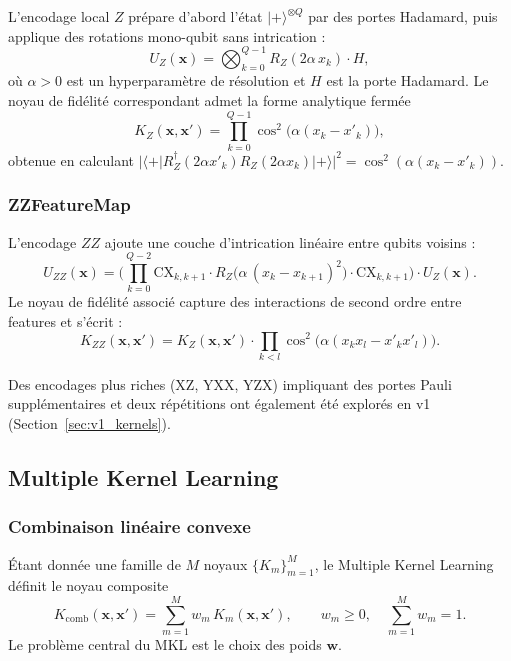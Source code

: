 \documentclass[12pt,a4paper]{article}
\begin{document}
L'encodage local $Z$ prépare d'abord l'état $|+\rangle^{\otimes Q}$ par
des portes Hadamard, puis applique des rotations mono-qubit sans intrication :
\begin{equation}
  U_Z(\bm{x}) = \bigotimes_{k=0}^{Q-1} R_Z(2\alpha\, x_k)\cdot H,
  \label{eq:zmap}
\end{equation}
où $\alpha > 0$ est un hyperparamètre de résolution et $H$ est la porte Hadamard.
Le noyau de fidélité correspondant admet la forme analytique fermée
\begin{equation}
  K_Z(\bm{x}, \bm{x}') = \prod_{k=0}^{Q-1} \cos^2\!\bigl(\alpha(x_k - x'_k)\bigr),
  \label{eq:kz}
\end{equation}
obtenue en calculant $|\langle+|R_Z^\dagger(2\alpha x'_k)R_Z(2\alpha x_k)|+\rangle|^2
= \cos^2(\alpha(x_k - x'_k))$.

\subsubsection{ZZFeatureMap}

L'encodage $ZZ$ ajoute une couche d'intrication linéaire entre qubits voisins :
\begin{equation}
  U_{ZZ}(\bm{x}) =
  \biggl(\prod_{k=0}^{Q-2}
  \mathrm{CX}_{k,k+1}\cdot
  R_Z\!\bigl(\alpha\,(x_k - x_{k+1})^2\bigr)\cdot
  \mathrm{CX}_{k,k+1}\biggr)\cdot U_Z(\bm{x}).
  \label{eq:zzmap}
\end{equation}
Le noyau de fidélité associé capture des interactions de second ordre entre
features et s'écrit :
\begin{equation}
  K_{ZZ}(\bm{x}, \bm{x}') = K_Z(\bm{x}, \bm{x}') \cdot
  \prod_{k < l} \cos^2\!\bigl(\alpha(x_k x_l - x'_k x'_l)\bigr).
  \label{eq:kzz}
\end{equation}

Des encodages plus riches (XZ, YXX, YZX) impliquant des portes Pauli
supplémentaires et deux répétitions ont également été explorés en v1
(Section~\ref{sec:v1_kernels}).

\subsection{Multiple Kernel Learning}
\label{sec:mkl}

\subsubsection{Combinaison linéaire convexe}

Étant donnée une famille de $M$ noyaux $\{K_m\}_{m=1}^M$, le Multiple Kernel
Learning définit le noyau composite
\begin{equation}
  K_{\mathrm{comb}}(\bm{x}, \bm{x}') = \sum_{m=1}^M w_m\,K_m(\bm{x}, \bm{x}'),
  \qquad w_m \geq 0, \quad \sum_{m=1}^M w_m = 1.
  \label{eq:mkl}
\end{equation}
Le problème central du MKL est le choix des poids $\bm{w}$.
\end{document}
